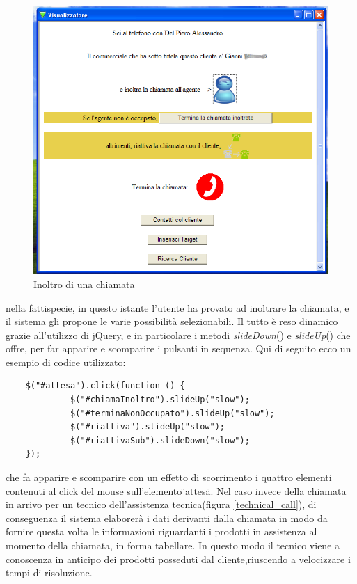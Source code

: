 \begin{figure}[!ht]
\centering
  \includegraphics[scale=0.75]{./images/inoltroScreen.png}
\caption{Inoltro di una chiamata}
\label{forward_call}
\end{figure}

\noindent
nella fattispecie, in questo istante l'utente ha provato ad inoltrare la chiamata, e il sistema gli propone le varie possibilit\`a selezionabili. Il tutto \`e reso dinamico grazie all'utilizzo di jQuery, e in particolare i metodi \textit{slideDown}() e \textit{slideUp}() che offre, per far apparire e scomparire i pulsanti in sequenza. Qui di seguito ecco un esempio di codice utilizzato:


\begin{verbatim}
    $("#attesa").click(function () {
             $("#chiamaInoltro").slideUp("slow");
             $("#terminaNonOccupato").slideUp("slow");
             $("#riattiva").slideUp("slow");
             $("#riattivaSub").slideDown("slow");
    });
\end{verbatim}               

\noindent
che fa apparire e scomparire con un effetto di scorrimento i quattro elementi contenuti al click del mouse sull'elemento \"{}attesa\"{}.
\noindent
Nel caso invece della chiamata in arrivo per un tecnico dell'assistenza tecnica(figura \ref{technical_call}), di conseguenza il sistema elaborer\`a i dati derivanti dalla chiamata in modo da fornire questa volta le informazioni riguardanti i prodotti in assistenza al momento della chiamata, in forma tabellare. In questo modo il tecnico viene a conoscenza in anticipo dei prodotti posseduti dal cliente,riuscendo a velocizzare i tempi di risoluzione.



